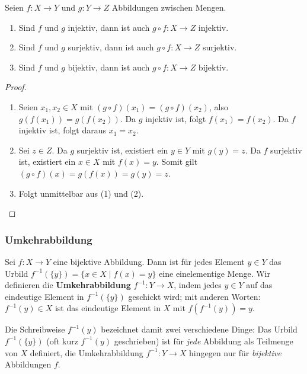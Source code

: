 \begin{lemma}
Seien $f:X\to Y$ und $g:Y\to Z$ Abbildungen zwischen Mengen.
\begin{enumerate}
    \item Sind $f$ und $g$ injektiv, dann ist auch $g\circ f:X\to Z$ injektiv.
    \item Sind $f$ und $g$ surjektiv, dann ist auch $g\circ f:X\to Z$ surjektiv.
    \item Sind $f$ und $g$ bijektiv, dann ist auch $g\circ f:X\to Z$ bijektiv.
\end{enumerate}
\end{lemma}
\begin{proof}
\begin{enumerate}
    \item Seien $x_1,x_2\in X$ mit $(g\circ f)(x_1)=(g\circ f)(x_2)$, also
    $g(f(x_1))=g(f(x_2))$. Da $g$ injektiv ist, folgt $f(x_1)=f(x_2)$.
    Da $f$ injektiv ist, folgt daraus $x_1=x_2$.
    \item Sei $z\in Z$. Da $g$ surjektiv ist, existiert ein $y\in Y$ mit
    $g(y)=z$. Da $f$ surjektiv ist, existiert ein $x\in X$ mit $f(x)=y$.
    Somit gilt $(g\circ f)(x)=g(f(x))=g(y)=z$.
    \item Folgt unmittelbar aus (1) und (2). \qedhere
\end{enumerate}
\end{proof}

\subsubsection*{Umkehrabbildung}
\begin{definition}[Umkehrabbildung]
Sei $f:X\to Y$ eine bijektive Abbildung. Dann ist für jedes Element
$y\in Y$ das Urbild $f^{-1}(\{y\})=\{x\in X\mid f(x)=y\}$ eine
einelementige Menge. Wir definieren die \textbf{Umkehrabbildung}
$f^{-1}:Y\to X$, indem jedes $y\in Y$ auf das eindeutige Element in
$f^{-1}(\{y\})$ geschickt wird; mit anderen Worten: $f^{-1}(y)\in X$ ist
das eindeutige Element in $X$ mit $f(f^{-1}(y))=y$.
\end{definition}

\begin{bemerkung}
Die Schreibweise $f^{-1}(y)$ bezeichnet damit zwei verschiedene Dinge:
Das Urbild $f^{-1}(\{y\})$ (oft kurz $f^{-1}(y)$ geschrieben) ist für
\emph{jede} Abbildung als Teilmenge von $X$ definiert, die Umkehrabbildung
$f^{-1}:Y\to X$ hingegen nur für \emph{bijektive} Abbildungen $f$.
\end{bemerkung}

